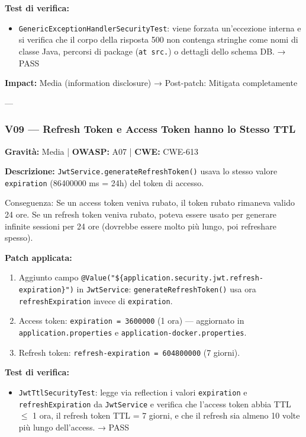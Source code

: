 \documentclass[12pt, a4paper]{article}
\begin{document}
    \textbf{Test di verifica:}
    \begin{itemize}
        \item \texttt{GenericExceptionHandlerSecurityTest}: viene forzata un'eccezione interna
        e si verifica che il corpo della risposta 500 non contenga stringhe come nomi di classe
        Java, percorsi di package (\texttt{at src.}) o dettagli dello schema DB. → \checkmark{} PASS
    \end{itemize}

    \textbf{Impact:} Media (information disclosure) → Post-patch: Mitigata completamente

    ---

    \subsubsection{V09 — Refresh Token e Access Token hanno lo Stesso TTL}

    \textbf{Gravità:} Media | \textbf{OWASP:} A07 | \textbf{CWE:} CWE-613

    \textbf{Descrizione:} \texttt{JwtService.generateRefreshToken()} usava lo stesso valore
    \texttt{expiration} (86400000 ms = 24h) del token di accesso.

    Conseguenza: Se un access token veniva rubato, il token rubato rimaneva valido 24 ore.
    Se un refresh token veniva rubato, poteva essere usato per generare infinite sessioni
    per 24 ore (dovrebbe essere molto più lungo, poi refreshare spesso).

    \textbf{Patch applicata:}
    \begin{enumerate}
        \item Aggiunto campo \texttt{@Value("\$\{application.security.jwt.refresh-expiration\}")}
        in \texttt{JwtService}: \texttt{generateRefreshToken()} usa ora \texttt{refreshExpiration}
        invece di \texttt{expiration}.
        \item Access token: \texttt{expiration = 3600000} (1 ora) --- aggiornato in
        \texttt{application.properties} e \texttt{application-docker.properties}.
        \item Refresh token: \texttt{refresh-expiration = 604800000} (7 giorni).
    \end{enumerate}

    \textbf{Test di verifica:}
    \begin{itemize}
        \item \texttt{JwtTtlSecurityTest}: legge via reflection i valori \texttt{expiration} e
        \texttt{refreshExpiration} da \texttt{JwtService} e verifica che l'access token abbia TTL
        $\leq$ 1 ora, il refresh token TTL = 7 giorni, e che il refresh sia almeno 10 volte
        più lungo dell'access. → \checkmark{} PASS
    \end{itemize}
\end{document}
